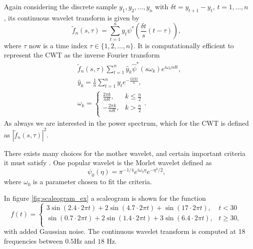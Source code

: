 \documentclass[a4paper]{memoir}
\theoremstyle{plain}
\theoremstyle{definition}
\theoremstyle{remark}
\begin{document}
Again considering the discrete sample $y_1, y_2, \hdots, y_n$ with $\delta t = y_{t+1} - y_t, \ t = 1, \hdots, n$, its continuous wavelet transform is given by \cite{torrence}
\begin{equation}\label{eq:cwt_d}
        \tilde{f}_n(s, \tau) = \sum_{t = 1}^{n} y_t \psi^* \left( \frac{\delta t}{s}(t- \tau) \right),
\end{equation}
where $\tau$ now is a time index $\tau \in \{ 1, 2, \hdots, n \}$.
It is computationally efficient \cite{torrence} to represent the CWT as the inverse Fourier transform
\begin{align*}
        &\tilde{f}_n(s, \tau) \sum_{t = 1}^{n}\hat{y}_k \hat{\psi}^*(s\omega_k)e^{i \omega_k n\delta t}, \\
        & \hat{y}_k = \frac{1}{n}\sum_{t = 1}^{n}y_t e^{-\frac{i2\pi kt}{n}},\\
        &\omega_k = 
                \begin{cases}
                      \frac{2\pi k}{n \delta t},   &  k \leq \frac{n}{2} \\
                      -\frac{2\pi k}{n \delta t},   &  k > \frac{n}{2} \\
                \end{cases}.
\end{align*}
As always we are interested in the power spectrum, which for the CWT is defined as $|\tilde{f}_n(s,\tau)|^2$.

There exists many choices for the mother wavelet, and certain important criteria it must satisfy \cite{kaiser}.
One popular wavelet is the Morlet wavelet defined as
\begin{equation}\label{eq:morlet}
        \psi_0(\eta) = \pi^{-1/4} e^{i\omega_0 \eta}e^{-\eta^2 / 2},
\end{equation}
where $\omega_0$ is a parameter chosen to fit the criteria.

In figure \ref{fig:scaleogram_ex} a scaleogram is shown for the function
\begin{equation}\label{eq:ex_scale}
        f(t) = 
                \begin{cases}
                        3 \sin(2.4 \cdot 2\pi t) + 2 \sin(4.7 \cdot 2 \pi t) + \sin(17 \cdot 2 \pi t), & t < 30 \\
                        \sin(0.7 \cdot 2 \pi t) + 2 \sin(1.4 \cdot 2 \pi t) + 3 \sin(6.4 \cdot 2 \pi t), & t \geq 30, \\
                \end{cases}
\end{equation}
with added Gaussian noise.
The continuous wavelet transform is computed at 18 frequencies between $0.5$Hz and $18$ Hz.
\end{document}
